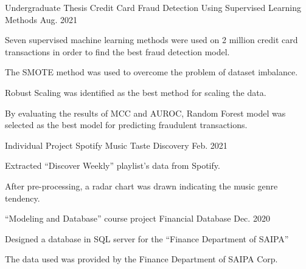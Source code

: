 

\begin{cventries}

  \cventry
    {Undergraduate Thesis} %
    {Credit Card Fraud Detection Using Supervised Learning Methods} %
    { } %
    {Aug. 2021} %
    {
      \begin{cvitems} %
        \item {Seven supervised machine learning methods were used on 2 million credit card transactions in order to find the best fraud detection model.}
        \item {The SMOTE method was used to overcome the problem of dataset imbalance.}
        \item {Robust Scaling was identified as the best method for scaling the data.}
        \item {By evaluating the results of MCC and AUROC, Random Forest model was selected as the best model for predicting fraudulent transactions.}
      \end{cvitems}
    }
  \cventry
    {Individual Project} %
    {Spotify Music Taste Discovery} %
    { } %
    {Feb. 2021} %
    {
      \begin{cvitems} %
        \item {Extracted ``Discover Weekly'' playlist's data from Spotify.}
        \item {After pre-processing, a radar chart was drawn indicating the music genre tendency.}
      \end{cvitems}
    }

  \cventry
    {``Modeling and Database'' course project} %
    {Financial Database} %
    { } %
    {Dec. 2020} %
    {
      \begin{cvitems} %
        \item {Designed a database in SQL server for the ``Finance Department of SAIPA''}
        \item {The data used was provided by the Finance Department of SAIPA Corp.}
      \end{cvitems}
    }


\end{cventries}
